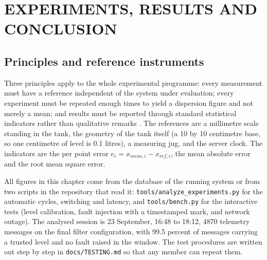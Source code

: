 \chapter{EXPERIMENTS, RESULTS AND CONCLUSION}

\section{Principles and reference instruments}

Three principles apply to the whole experimental programme: every measurement must have a reference independent of the system under evaluation; every experiment must be repeated enough times to yield a dispersion figure and not merely a mean; and results must be reported through standard statistical indicators rather than qualitative remarks \cite{bentley2005, jcgm100}. The references are a millimetre scale standing in the tank, the geometry of the tank itself (a 10 by 10 centimetre base, so one centimetre of level is 0.1 litres), a measuring jug, and the server clock. The indicators are the per point error $e_i = x_{meas,i} - x_{ref,i}$, the mean absolute error and the root mean square error.

All figures in this chapter come from the database of the running system or from two scripts in the repository that read it: \texttt{tools/analyze\_experiments.py} for the automatic cycles, switching and latency, and \texttt{tools/bench.py} for the interactive tests (level calibration, fault injection with a timestamped mark, and network outage). The analysed session is 23 September, 16:48 to 18:12, 4870 telemetry messages on the final filter configuration, with 99.5 percent of messages carrying a trusted level and no fault raised in the window. The test procedures are written out step by step in \texttt{docs/TESTING.md} so that any member can repeat them.


